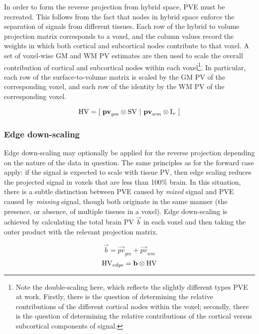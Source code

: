 In order to form the reverse projection from hybrid space, PVE must be recreated. This follows from the fact that nodes in hybrid space enforce the separation of signals from different tissues. Each row of the hybrid to volume projection matrix corresponds to a voxel, and the column values record the weights in which both cortical and subcortical nodes contribute to that voxel. A set of voxel-wise GM and WM PV estimates are then used to scale the overall contribution of cortical and subcortical nodes within each voxel\footnote{Note the double-scaling here, which reflects the slightly different types PVE at work. Firstly, there is the question of determining the relative contributions of the different cortical nodes within the voxel; secondly, there is the question of determining the relative contributions of the cortical versus subcortical components of signal.}. In particular, each row of the surface-to-volume matrix is scaled by the GM PV of the corresponding voxel, and each row of the identity by the WM PV of the corresponding voxel. 

\begin{equation}
\mathrm{HV} = [\ \mathbf{pv}_{gm} \otimes \mathrm{SV} \ | \ \mathbf{pv}_{wm} \otimes \mathrm{I}_v \ ]
\end{equation}

\subsubsection{Edge down-scaling}

Edge down-scaling may optionally be applied for the reverse projection depending on the nature of the data in question. The same principles as for the forward case apply: if the signal is expected to scale with tissue PV, then edge scaling reduces the projected signal in voxels that are less than 100\% brain. In this situation, there is a subtle distinction between PVE caused by \textit{mixed} signal and PVE caused by \textit{missing} signal, though both originate in the same manner (the presence, or absence, of multiple tissues in a voxel). Edge down-scaling is achieved by calculating the total brain PV $\vec{b}$ in each voxel and then taking the outer product with the relevant projection matrix. 

\begin{equation}
\vec{b} = \vec{pv}_{gm} + \vec{pv}_{wm}
\end{equation}
\begin{equation}
\mathrm{HV}_{edge} = \mathbf{b} \otimes \mathrm{HV}
\end{equation}

